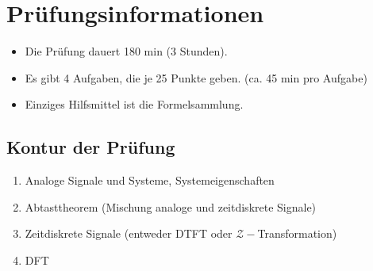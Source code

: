 \documentclass[11pt]{article}
\begin{document}
\pagebreak


\pagebreak


\pagebreak

\section*{Prüfungsinformationen}
\vspace*{-0.5cm}
\begin{itemize}
    \item Die Prüfung dauert 180 min (3 Stunden).
    \item Es gibt 4 Aufgaben, die je 25 Punkte geben. (ca. 45 min pro Aufgabe)
    \item Einziges Hilfsmittel ist die Formelsammlung.
\end{itemize}

\subsection*{Kontur der Prüfung}
\vspace*{-0.5cm}
\begin{enumerate}
    \item Analoge Signale und Systeme, Systemeigenschaften
    \item Abtasttheorem (Mischung analoge und zeitdiskrete Signale)
    \item Zeitdiskrete Signale (entweder DTFT oder $\mathcal{Z}-$Transformation)
    \item DFT
\end{enumerate}
\end{document}
